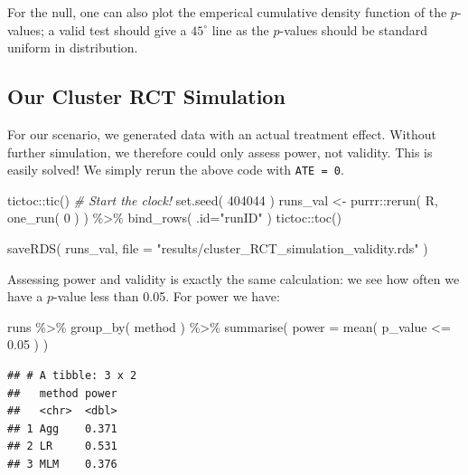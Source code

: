\documentclass[
]{book}
\newenvironment{Shaded}{\begin{snugshade}}{\end{snugshade}}
\newcommand{\AttributeTok}[1]{\textcolor[rgb]{0.77,0.63,0.00}{#1}}
\newcommand{\CommentTok}[1]{\textcolor[rgb]{0.56,0.35,0.01}{\textit{#1}}}
\newcommand{\DecValTok}[1]{\textcolor[rgb]{0.00,0.00,0.81}{#1}}
\newcommand{\FloatTok}[1]{\textcolor[rgb]{0.00,0.00,0.81}{#1}}
\newcommand{\FunctionTok}[1]{\textcolor[rgb]{0.00,0.00,0.00}{#1}}
\newcommand{\NormalTok}[1]{#1}
\newcommand{\OtherTok}[1]{\textcolor[rgb]{0.56,0.35,0.01}{#1}}
\newcommand{\SpecialCharTok}[1]{\textcolor[rgb]{0.00,0.00,0.00}{#1}}
\newcommand{\StringTok}[1]{\textcolor[rgb]{0.31,0.60,0.02}{#1}}
\begin{document}
For the null, one can also plot the emperical cumulative density function of the \(p\)-values; a valid test should give a \(45^\circ\) line as the \(p\)-values should be standard uniform in distribution.

\hypertarget{our-cluster-rct-simulation}{%
\subsection{Our Cluster RCT Simulation}\label{our-cluster-rct-simulation}}

For our scenario, we generated data with an actual treatment effect.
Without further simulation, we therefore could only assess power, not validity.
This is easily solved!
We simply rerun the above code with \texttt{ATE\ =\ 0}.

\begin{Shaded}
\begin{Highlighting}[]
\NormalTok{tictoc}\SpecialCharTok{::}\FunctionTok{tic}\NormalTok{()  }\CommentTok{\# Start the clock!}
\FunctionTok{set.seed}\NormalTok{( }\DecValTok{404044}\NormalTok{ )}
\NormalTok{runs\_val }\OtherTok{\textless{}{-}} 
\NormalTok{  purrr}\SpecialCharTok{::}\FunctionTok{rerun}\NormalTok{( R, }\FunctionTok{one\_run}\NormalTok{( }\DecValTok{0}\NormalTok{ ) ) }\SpecialCharTok{\%\textgreater{}\%}
  \FunctionTok{bind\_rows}\NormalTok{( }\AttributeTok{.id=}\StringTok{"runID"}\NormalTok{ )}
\NormalTok{tictoc}\SpecialCharTok{::}\FunctionTok{toc}\NormalTok{()}

\FunctionTok{saveRDS}\NormalTok{( runs\_val, }\AttributeTok{file =} \StringTok{"results/cluster\_RCT\_simulation\_validity.rds"}\NormalTok{ )}
\end{Highlighting}
\end{Shaded}

Assessing power and validity is exactly the same calculation: we see how often we have a \(p\)-value less than 0.05.
For power we have:

\begin{Shaded}
\begin{Highlighting}[]
\NormalTok{runs }\SpecialCharTok{\%\textgreater{}\%} \FunctionTok{group\_by}\NormalTok{( method ) }\SpecialCharTok{\%\textgreater{}\%}
  \FunctionTok{summarise}\NormalTok{( }\AttributeTok{power =} \FunctionTok{mean}\NormalTok{( p\_value }\SpecialCharTok{\textless{}=} \FloatTok{0.05}\NormalTok{ ) )}
\end{Highlighting}
\end{Shaded}

\begin{verbatim}
## # A tibble: 3 x 2
##   method power
##   <chr>  <dbl>
## 1 Agg    0.371
## 2 LR     0.531
## 3 MLM    0.376
\end{verbatim}
\end{document}
